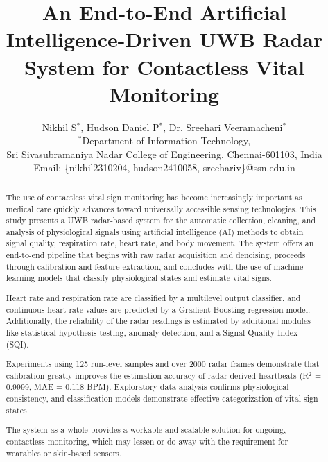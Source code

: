 \documentclass[conference]{IEEEtran}
\begin{document}
\sloppy

\title{An End-to-End Artificial Intelligence-Driven UWB Radar System for
Contactless Vital Monitoring\\
}

\author{
Nikhil S$^{\ast}$,
Hudson Daniel P$^{\ast}$,
Dr. Sreehari Veeramacheni$^{\ast}$\\

$^{\ast}$Department of Information Technology,\\
Sri Sivasubramaniya Nadar College of Engineering, Chennai-601103, India\\
Email: \{nikhil2310204, hudson2410058, sreehariv\}@ssn.edu.in
}

\maketitle

\begin{abstract}
The use of contactless vital sign monitoring has
become increasingly important as medical care quickly
advances toward universally accessible sensing
technologies. This study presents a UWB radar-based
system for the automatic collection, cleaning, and analysis
of physiological signals using artificial intelligence (AI)
methods to obtain signal quality, respiration rate, heart
rate, and body movement. The system offers an end-to-end
pipeline that begins with raw radar acquisition and
denoising, proceeds through calibration and feature
extraction, and concludes with the use of machine learning
models that classify physiological states and estimate vital
signs.

Heart rate and respiration rate are classified by a multilevel output classifier, and continuous heart-rate values are
predicted by a Gradient Boosting regression model.
Additionally, the reliability of the radar readings is
estimated by additional modules like statistical hypothesis
testing, anomaly detection, and a Signal Quality Index
(SQI).

Experiments using 125 run-level samples and over 2000
radar frames demonstrate that calibration greatly
improves the estimation accuracy of radar-derived
heartbeats (R$^2$ = 0.9999, MAE = 0.118 BPM). Exploratory data analysis confirms physiological consistency, and classification models demonstrate effective categorization of vital sign states.

The system as a whole provides a workable and
scalable solution for ongoing, contactless monitoring, which
may lessen or do away with the requirement for wearables
or skin-based sensors.
\end{abstract}
\end{document}
